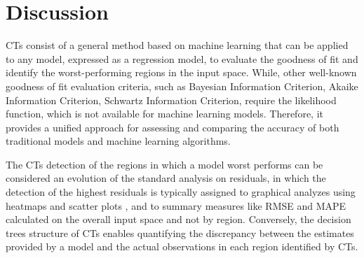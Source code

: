\documentclass[fleqn,10pt]{wlscirep}
\begin{document}
\section*{Discussion}

CTs consist of a general method based on machine learning that can be applied to any model, expressed as a regression model, to evaluate the goodness of fit and identify the worst-performing regions in the input space. While, other well-known goodness of fit evaluation criteria, such as Bayesian Information Criterion, Akaike Information Criterion, Schwartz Information Criterion, require the likelihood function, which is not available for machine learning models. Therefore, it provides a unified approach for assessing and comparing the accuracy of both traditional models and machine learning algorithms.

The CTs detection of the regions in which a model worst performs can be considered an evolution of the standard analysis on residuals, in which the detection of the highest residuals is typically assigned to graphical analyzes using heatmaps and scatter plots \cite{CBD09,Villegas2018}, and to summary measures like RMSE and MAPE calculated on the overall input space and not by region.
Conversely, the decision trees structure of CTs enables quantifying the discrepancy between the estimates provided by a model and the actual observations in each region identified by CTs.
\end{document}

